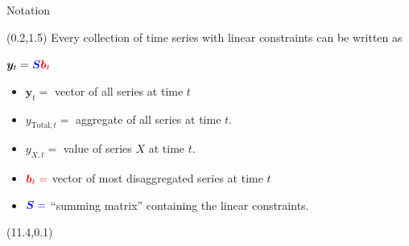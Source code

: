 \documentclass[
  14pt,
  ignorenonframetext,
  aspectratio=169,
]{beamer}
\def\bY{\bm{y}}
\def\by{\bm{y}}
\def\bS{\bm{S}}
\begin{document}
\begin{frame}{Notation}
\label{notation}
\begin{textblock}{8.5}(0.2,1.5)
Every collection of time series with linear constraints can be written as
\centerline{\colorbox[RGB]{210,210,210}{$\bY_{t}=\color{blue}\bS\color{red}\bm{b}_{t}$}}
\vspace*{-0.9cm}\begin{itemize}\parskip=0cm\itemsep=0cm
\item $\by_t=$ vector of all series at time $t$
\item $ y_{\text{Total},t}= $ aggregate of all series at time
$t$.
\item $ y_{X,t}= $ value of series $X$ at time $t$.
\item $\color{red}{\bm{b}_t}=$ vector of most disaggregated series at time $t$
\item $\color{blue}{\bS}=$ ``summing matrix'' containing the linear constraints.
\end{itemize}
\end{textblock}

\begin{textblock}{5.7}(11.4,0.1)
\begin{minipage}{4cm}
\begin{block}{}\centering
{}
\end{block}
\end{minipage}
\end{textblock}


\end{frame}
\end{document}
